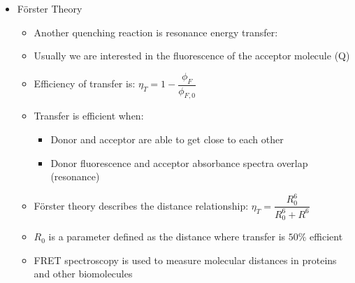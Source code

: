 \documentclass[12pt, openany, letterpaper]{memoir}
\begin{document}
\begin{itemize}
\begin{itemize}
	      \end{itemize}
	\item F\"orster Theory
	      \begin{itemize}
		      \item Another quenching reaction is resonance energy transfer: 
		      \item Usually we are interested in the fluorescence of the acceptor molecule (Q)
		      \item Efficiency of transfer is: $\eta_T = 1 - \dfrac{\phi_F}{\phi_{F,0}}$
		      \item Transfer is efficient when:
		            \begin{itemize}
			            \item Donor and acceptor are able to get close to each other
			            \item Donor fluorescence and acceptor absorbance spectra overlap (resonance)
		            \end{itemize}
		      \item F\"orster theory describes the distance relationship: $\eta_T = \dfrac{R_0^6}{R_0^6 + R^6}$
		      \item $R_0$ is a parameter defined as the distance where transfer is $50\%$ efficient
		      \item FRET spectroscopy is used to measure molecular distances in proteins and other biomolecules
	      \end{itemize}
\end{itemize}
\end{document}
